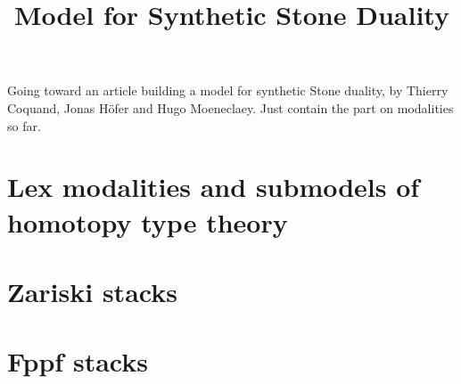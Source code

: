 \documentclass{../util/zariski}
\title{Model for Synthetic Stone Duality}
\begin{document}
\maketitle

Going toward an article building a model for synthetic Stone duality, by Thierry Coquand, Jonas Höfer and Hugo Moeneclaey. Just contain the part on modalities so far.

\tableofcontents

\section{Lex modalities and submodels of homotopy type theory}


\section{Zariski stacks}


\section{Fppf stacks}


%

%

%

%



\printindex

\printbibliography
\end{document}
